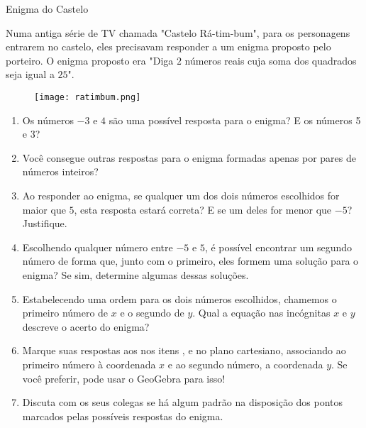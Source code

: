 \begin{task}{Enigma do Castelo}
\label{castelo}

Numa antiga série de TV chamada "Castelo Rá-tim-bum", para os personagens entrarem no castelo, eles precisavam responder a um enigma proposto pelo porteiro. O enigma proposto era "Diga $2$ números reais cuja soma dos quadrados seja igual a $25$".

\begin{figure}[H]
\centering

\noindent\texttt{[image: ratimbum.png]}
\end{figure}



\begin{enumerate}
\item {} 
Os números $-3$ e $4$ são uma possível resposta para o enigma? E os números 5 e 3?

\item {} 
Você consegue outras respostas para o enigma formadas apenas por pares de números inteiros?

\item {} 
Ao responder ao enigma, se qualquer um dos dois números escolhidos for maior que $5$, esta resposta estará correta? E se um deles for menor que $-5$? Justifique.

\item {}
Escolhendo qualquer número entre $-5$ e $5$, é possível encontrar um segundo número de forma que, junto com o primeiro, eles formem uma solução para o enigma? Se sim, determine algumas dessas soluções.

\item {}
Estabelecendo uma ordem para os dois números escolhidos, chamemos o primeiro número de $x$ e o segundo de $y$. Qual a equação nas incógnitas $x$ e $y$ descreve o acerto do enigma?

\item {}
Marque suas respostas aos nos itens ,  e  no plano cartesiano, associando ao primeiro número à coordenada $x$ e ao segundo número, a coordenada $y$. Se você preferir, pode usar o GeoGebra para isso!

\item {}
Discuta com os seus colegas se há algum padrão na disposição dos pontos marcados pelas possíveis respostas do enigma.

\end{enumerate}
\end{task}


